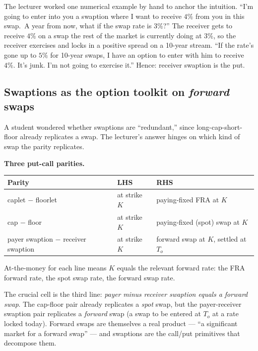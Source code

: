 The lecturer worked one numerical example by hand to anchor the
intuition. ``I'm going to enter into you a swaption where I want to
receive $4\%$ from you in this swap.\ A year from now, what if the
swap rate is $3\%$?'' The receiver gets to receive $4\%$ on a swap
the rest of the market is currently doing at $3\%$, so the receiver
exercises and locks in a positive spread on a 10-year stream. ``If
the rate's gone up to $5\%$ for 10-year swaps, I have an option to
enter with him to receive $4\%$. It's junk. I'm not going to exercise
it.'' Hence: receiver swaption is the put.

\subsection{Swaptions as the option toolkit on \emph{forward} swaps}\label{L6-sec:swaption-fwd}

A student wondered whether swaptions are ``redundant,'' since long-cap-short-floor already replicates a swap. The lecturer's answer
hinges on which kind of swap the parity replicates.

\begin{keyblock}
\textbf{Three put-call parities.}
\begin{center}
\begin{tabular}{l|l|l}
\textbf{Parity} & \textbf{LHS} & \textbf{RHS} \\
\hline
caplet $-$ floorlet & at strike $K$ & paying-fixed FRA at $K$ \\
cap $-$ floor & at strike $K$ & paying-fixed (spot) swap at $K$ \\
payer swaption $-$ receiver swaption & at strike $K$ & forward swap at $K$, settled at $T_o$ \\
\end{tabular}
\end{center}
At-the-money for each line means $K$ equals the relevant forward
rate: the FRA forward rate, the spot swap rate, the forward swap
rate.
\end{keyblock}

The crucial cell is the third line: \emph{payer minus receiver
swaption equals a forward swap}. The cap-floor pair already replicates
a \emph{spot} swap, but the payer-receiver swaption pair replicates a
\emph{forward} swap (a swap to be entered at $T_o$ at a rate locked
today). Forward swaps are themselves a real product --- ``a
significant market for a forward swap'' --- and swaptions are the
call/put primitives that decompose them.

